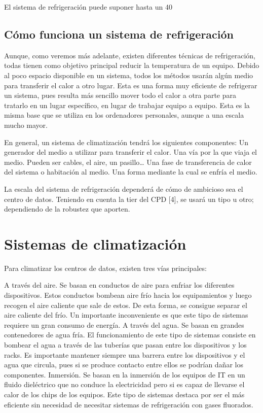 El sistema de refrigeración puede suponer hasta un 40%




\subsection*{Cómo funciona un sistema de refrigeración}

Aunque, como veremos más adelante, existen diferentes técnicas de refrigeración, todas tienen como objetivo principal reducir la temperatura de un equipo. Debido al poco espacio disponible en un sistema, todos los métodos usarán algún medio para transferir el calor a otro lugar. Esta es una forma muy eficiente de refrigerar un sistema, pues resulta más sencillo mover todo el calor a otra parte para tratarlo en un lugar específico, en lugar de trabajar equipo a equipo. Esta es la misma base que se utiliza en los ordenadores personales, aunque a una escala mucho mayor.

En general, un sistema de climatización tendrá los siguientes componentes:
Un generador del medio a utilizar para transferir el calor.
Una vía por la que viaja el medio. Pueden ser cables, el aire, un pasillo…
Una fase de transferencia de calor del sistema o habitación al medio.
Una forma mediante la cual se enfría el medio.

La escala del sistema de refrigeración dependerá de cómo de ambicioso sea el centro de datos. Teniendo en cuenta la tier del CPD [4], se usará un tipo u otro; dependiendo de la robustez que aporten.


\section*{Sistemas de climatización}

Para climatizar los centros de datos, existen tres vías principales:

A través del aire. Se basan en conductos de aire para enfriar los diferentes dispositivos. Estos conductos bombean aire frío hacia los equipamientos y luego recogen el aire caliente que sale de estos. De esta forma, se consigue separar el aire caliente del frío. Un importante inconveniente es que este tipo de sistemas requiere un gran consumo de energía.
A través del agua. Se basan en grandes contenedores de agua fría. El funcionamiento de este tipo de sistemas consiste en bombear el agua a través de las tuberías que pasan entre los dispositivos y los racks. Es importante mantener siempre una barrera entre los dispositivos y el agua que circula, pues si se produce contacto entre ellos se podrían dañar los componentes.
Inmersión. Se basan en la inmersión de los equipos de IT en un fluido dieléctrico que no conduce la electricidad pero si es capaz de llevarse el calor de los chips de los equipos. Este tipo de sistemas destaca por ser el más eficiente sin necesidad de necesitar sistemas de refrigeración con gases fluorados.

